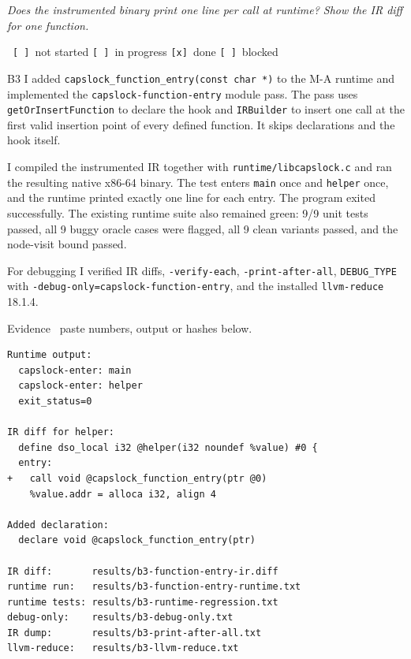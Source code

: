 \documentclass[11pt,a4paper]{article}
\newcommand{\lbl}[1]{\vspace{5pt}\noindent{\scriptsize\bfseries\color{mute}\MakeUppercase{#1}}\par\vspace{1pt}}
\begin{document}
\lbl{You will be asked}
\begin{askbox}
\emph{Does the instrumented binary print one line per call at runtime? Show the IR diff for one function.}
\end{askbox}
\ \texttt{[\ ]}~not started \quad
  \texttt{[\ ]}~in progress \quad \texttt{[x]}~done \quad
  \texttt{[\ ]}~blocked\par\vspace{3pt}
\begin{answerbox}{B3}
I added \texttt{capslock\_function\_entry(const char *)} to the M-A runtime
and implemented the \texttt{capslock-function-entry} module pass.  The pass
uses \texttt{getOrInsertFunction} to declare the hook and \texttt{IRBuilder}
to insert one call at the first valid insertion point of every defined
function.  It skips declarations and the hook itself.

I compiled the instrumented IR together with \texttt{runtime/libcapslock.c}
and ran the resulting native x86-64 binary.  The test enters \texttt{main}
once and \texttt{helper} once, and the runtime printed exactly one line for
each entry.  The program exited successfully.  The existing runtime suite
also remained green: 9/9 unit tests passed, all 9 buggy oracle cases were
flagged, all 9 clean variants passed, and the node-visit bound passed.

For debugging I verified IR diffs, \texttt{-verify-each},
\texttt{-print-after-all}, \texttt{DEBUG\_TYPE} with
\texttt{-debug-only=capslock-function-entry}, and the installed
\texttt{llvm-reduce} 18.1.4.

{\scriptsize\color{mute}Evidence \textemdash\ paste numbers, output or hashes below.}
\begin{verbatim}
Runtime output:
  capslock-enter: main
  capslock-enter: helper
  exit_status=0

IR diff for helper:
  define dso_local i32 @helper(i32 noundef %value) #0 {
  entry:
+   call void @capslock_function_entry(ptr @0)
    %value.addr = alloca i32, align 4

Added declaration:
  declare void @capslock_function_entry(ptr)

IR diff:       results/b3-function-entry-ir.diff
runtime run:   results/b3-function-entry-runtime.txt
runtime tests: results/b3-runtime-regression.txt
debug-only:    results/b3-debug-only.txt
IR dump:       results/b3-print-after-all.txt
llvm-reduce:   results/b3-llvm-reduce.txt
\end{verbatim}
\end{answerbox}
\end{document}
